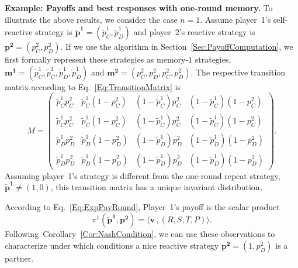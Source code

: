 \documentclass[11pt]{article}
\theoremstyle{plainCl1}
\theoremstyle{plainCl2}
\begin{document}
\noindent
{\bf Example: Payoffs and best responses with one-round memory.}
To illustrate the above results, we consider the case $n\!=\!1$. 
Assume player~1's self-reactive strategy is $\mathbf{\tilde p^1} \!=\! (\tilde p_C^1, \tilde p_D^1)$ and player~2's reactive strategy is $\mathbf{p^2} \!=\! (p^2_C, p^2_D)$. 
If we use the algorithm in Section~\ref{Sec:PayoffComputation}, we first formally represent these strategies as memory-1 strategies, $\mathbf{m^1} = (\tilde p_C^1, \tilde p_C^1,  \tilde p_D^1,  \tilde p_D^1)$ and $\mathbf{m^2} = (p_C^2, p_D^2,  p_C^2,  p_D^2)$.
The respective transition matrix according to Eq.~\eqref{Eq:TransitionMatrix} is
\begin{equation} \label{Eq:TransitionM1}
M=\left(
\begin{array}{cccc}
\tilde p^1_C p^2_C	&\tilde p^1_C(1\!-\!p^2_C)	&(1\!-\!\tilde p^1_C)p^2_C	&(1\!-\!\tilde p^1_C)(1\!-\!p^2_C)\\
\tilde p^1_C p^2_C	&\tilde p^1_C(1\!-\!p^2_C)	&(1\!-\!\tilde p^1_C)p^2_C	&(1\!-\!\tilde p^1_C)(1\!-\!p^2_C)\\
\tilde p^1_D p^2_D	&\tilde p^1_D(1\!-\!p^2_D)	&(1\!-\!\tilde p^1_D)p^2_D	&(1\!-\!\tilde p^1_D)(1\!-\!p^2_D)\\
\tilde p^1_D p^2_D	&\tilde p^1_D(1\!-\!p^2_D)	&(1\!-\!\tilde p^1_D)p^2_D	&(1\!-\!\tilde p^1_D)(1\!-\!p^2_D)
\end{array}
\right).
\end{equation}
Assuming player~1's strategy is different from the one-round repeat strategy, $\mathbf{\tilde p^1} \!\neq\! (1,0)$, this transition matrix has a unique invariant distribution,
{\begin{center}
\end{center}}
\noindent
According to Eq.~\eqref{Eq:ExpPayRound}, Player~1's payoff is the scalar product 
\begin{equation} \label{Eq:PayExample}
\pi^1(\mathbf{\tilde p^1},\mathbf{p^2})=\big\langle\mathbf{v}\, , (R,S,T,P)\big\rangle.
\end{equation} 
Following~Corollary~\ref{Cor:NashCondition}, we can use these observations to characterize under which conditions a nice reactive strategy $\mathbf{p^2}\!=\!(1,p^2_D)$ is a partner. 
\end{document}
